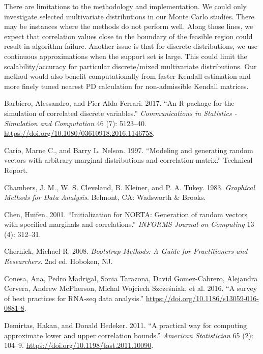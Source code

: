 \documentclass{article}
\newlength{\cslhangindent}
\newenvironment{CSLReferences}[2] %
 {%
  \setlength{\parindent}{0pt}
  \ifodd #1 \everypar{\setlength{\hangindent}{\cslhangindent}}\ignorespaces\fi
  \ifnum #2 > 0
  \setlength{\parskip}{#2\baselineskip}
  \fi
 }%
 {}
\begin{document}
There are limitations to the methodology and implementation. We could
only investigate selected multivariate distributions in our Monte Carlo
studies. There may be instances where the methods do not perform well.
Along those lines, we expect that correlation values close to the
boundary of the feasible region could result in algorithm failure.
Another issue is that for discrete distributions, we use continuous
approximations when the support set is large. This could limit the
scalability/accuracy for particular discrete/mixed multivariate
distributions. Our method would also benefit computationally from faster
Kendall estimation and more finely tuned nearest PD calculation for
non-admissible Kendall matrices.

\hypertarget{refs}{}
\begin{CSLReferences}{1}{0}
\leavevmode{}%
Barbiero, Alessandro, and Pier Alda Ferrari. 2017. {``{An R package for
the simulation of correlated discrete variables}.''}
\emph{Communications in Statistics - Simulation and Computation} 46 (7):
5123--40. \url{https://doi.org/10.1080/03610918.2016.1146758}.

\leavevmode{}%
Cario, Marne C., and Barry L. Nelson. 1997. {``{Modeling and generating
random vectors with arbitrary marginal distributions and correlation
matrix}.''} Technical Report.

\leavevmode{}%
Chambers, J. M., W. S. Cleveland, B. Kleiner, and P. A. Tukey. 1983.
\emph{{Graphical Methods for Data Analysis}}. Belmont, CA: Wadsworth
{\&} Brooks.

\leavevmode{}%
Chen, Huifen. 2001. {``{Initialization for NORTA: Generation of random
vectors with specified marginals and correlations}.''} \emph{INFORMS
Journal on Computing} 13 (4): 312--31.

\leavevmode{}%
Chernick, Michael R. 2008. \emph{{Bootstrap Methods: A Guide for
Practitioners and Researchers}}. 2nd ed. Hoboken, NJ.

\leavevmode{}%
Conesa, Ana, Pedro Madrigal, Sonia Tarazona, David Gomez-Cabrero,
Alejandra Cervera, Andrew McPherson, Michal Wojciech Szcześniak, et al.
2016. {``{A survey of best practices for RNA-seq data analysis}.''}
\url{https://doi.org/10.1186/s13059-016-0881-8}.

\leavevmode{}%
Demirtas, Hakan, and Donald Hedeker. 2011. {``{A practical way for
computing approximate lower and upper correlation bounds}.''}
\emph{American Statistician} 65 (2): 104--9.
\url{https://doi.org/10.1198/tast.2011.10090}.


\end{CSLReferences}
\end{document}
